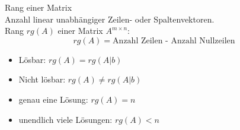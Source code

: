 \begin{theorem}{Rang einer Matrix}\\
    Anzahl linear unabhängiger Zeilen- oder Spaltenvektoren.\\
    Rang $rg(A)$ einer Matrix $A^{m \times n}$:
    $$rg(A) = \text{Anzahl Zeilen - Anzahl Nullzeilen}$$
    \begin{itemize}
        \item Lösbar: $rg(A) = rg(A|b)$
        \item Nicht lösbar: $rg(A) \neq rg(A|b)$
        \item genau eine Lösung: $rg(A) = n$
        \item unendlich viele Lösungen: $rg(A) < n$
    \end{itemize}
\end{theorem}

